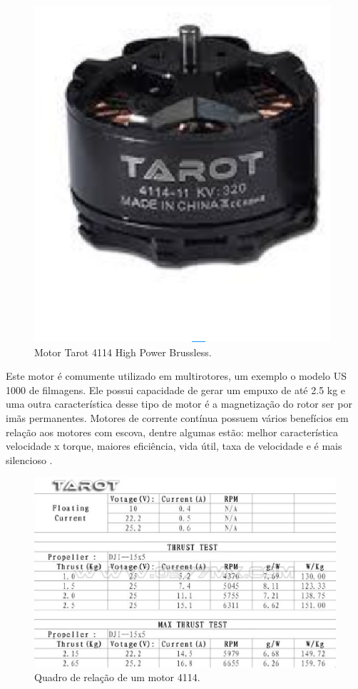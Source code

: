 \begin{figure}[H]
    \centering
      \includegraphics[keepaspectratio=true,scale=0.5]{figuras/tarot2.eps}
    \caption{Motor Tarot 4114 High Power Brussless. \cite{tarot}}
    \label{fig:tarot2}
\end{figure}
\vfill
Este motor é comumente utilizado em  multirotores, um exemplo o modelo US 1000 de filmagens. Ele possui capacidade de gerar um empuxo de até 2.5 kg e uma outra característica desse tipo de motor é a magnetização do rotor ser por imãs permanentes. Motores de corrente contínua possuem vários benefícios em relação aos motores com escova, dentre algumas estão: melhor característica velocidade x torque, maiores eficiência, vida útil, taxa de velocidade e é mais silencioso \cite{nascimento}.

\begin{figure}[H]
    \centering
      \includegraphics[keepaspectratio=true,scale=0.5]{figuras/tarot.eps}
    \caption{Quadro de relação de um motor 4114.\cite{tarot}}
    \label{fig:tarot}
\end{figure}

